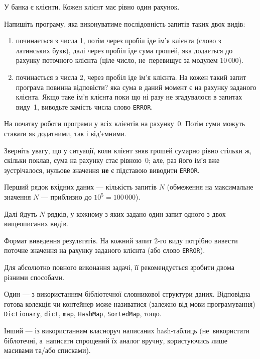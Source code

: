 ﻿У банка є клієнти. Кожен клієнт має рівно один рахунок.

Напишіть програму, яка виконуватиме послідовність запитів таких двох видів:

\begin{enumerate}
\item
починається з числа 1, потім через пробіл іде ім’я клієнта (слово з латинських букв), далі через пробіл іде сума грошей, яка додається до рахунку поточного клієнта (ціле число, не~перевищує за модулем $10\,000$).
\item
починається з числа 2, через пробіл іде ім’я клієнта. На кожен такий запит програма повинна відповісти? яка сума в даний момент є на рахунку заданого клієнта. Якщо таке ім’я клієнта поки що ні разу не згадувалося в запитах виду~1, виводьте замість числа слово \texttt{ERROR}.
\end{enumerate}

На початку роботи програми у всіх клієнтів на рахунку~0. Потім суми можуть ставати як додатними, так і від’ємними.

Зверніть увагу, що у ситуації, коли клієнт зняв грошей сумарно рівно стільки ж, скільки поклав, сума на рахунку стає рівною~0; але, раз його ім’я вже зустрічалося, нульове значення \textbf{не} є підставою виводити \texttt{ERROR}.

\InputFile
Перший рядок вхідних даних --- кількість запитів $N$ (обмеження на максимальне значення $N$ --- приблизно до $10^5=100\,000$). 

Далі йдуть $N$ рядків, у кожному з яких задано один запит одного з двох вищеописаних видів.

\OutputFile
Формат виведення результатів. На кожний запит 2-го виду потрібно вивести поточне значення на рахунку заданого клієнта (або слово \texttt{ERROR}).


\Examples

\begin{example}
\end{example}

\Note
Для абсолютно повного виконання задачі, її рекомендується зробити двома різними способами. 

Один --- з використанням бібліотечної словникової структури даних. Відповідна готова колекція чи контейнер може називатися (залежно від мови програмування) \texttt{Dictionary}, \texttt{dict}, \texttt{map}, \texttt{HashMap}, \texttt{SortedMap}, тощо.

Інший --- із використанням власноруч написаних hash-таблиць (не~використати біблотечні, а~написати спрощений їх аналог вручну, користуючись лише масивами та/або списками).
